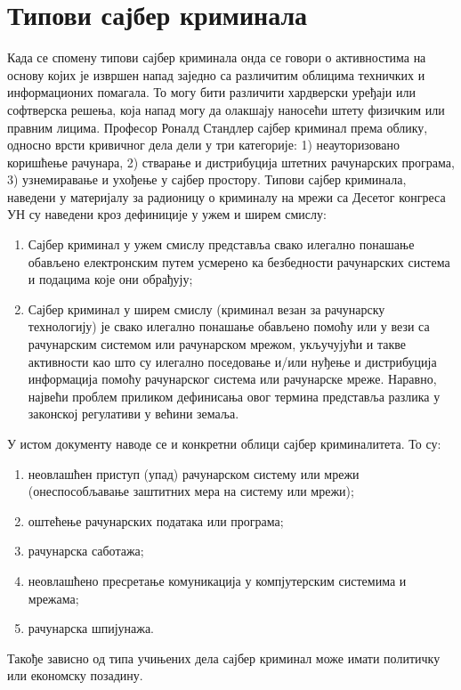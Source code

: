 \documentclass[a4paper]{article}
\begin{document}
	\section{Типови сајбер криминала}
	\label{sec:TipoviVisKri}
	Када се спомену типови сајбер криминала онда се говори о активностима на основу којих је извршен напад заједно са различитим облицима техничких и информационих помагала. То могу бити различити хардверски уређаји или софтверска решења, која напад могу да олакшају наносећи штету физичким или правним лицима. \newline
	Професор Роналд Стандлер сајбер криминал према облику, односно врсти кривичног дела дели у три категорије: 1) неауторизовано коришћење рачунара, 2) стварање и дистрибуција штетних рачунарских програма, 3) узнемиравање и ухођење у сајбер простору. \newline
	Типови сајбер криминала, наведени у материјалу за радионицу о криминалу на мрежи са Десетог конгреса УН су наведени кроз дефиниције у ужем и ширем смислу:
	\begin{enumerate}
		\item Сајбер криминал у ужем смислу представља свако илегално понашање обављено електронским путем усмерено ка безбедности рачунарских система и подацима које они обрађују;
		\item Сајбер криминал у ширем смислу (криминал везан за рачунарску технологију) је свако илегално понашање обављено помоћу или у вези са рачунарским системом или рачунарском мрежом, укључујући и такве активности као што су илегално поседовање и/или нуђење и дистрибуција информација помоћу рачунарског система или рачунарске мреже. Наравно, највећи проблем приликом дефинисања овог термина представља разлика у законској регулативи у већини земаља.
	\end{enumerate}
	
	У истом документу наводе се и конкретни облици сајбер криминалитета. То су:
	\begin{enumerate}
		\item неовлашћен приступ (упад) рачунарском систему или мрежи (онеспособљавање заштитних мера на систему или мрежи);
		\item оштећење рачунарских података или програма;
		\item рачунарска саботажа;
		\item неовлашћено пресретање комуникација у компјутерским системима и мрежама;
		\item рачунарска шпијунажа.
	\end{enumerate}
	Такође зависно од типа учињених дела сајбер криминал може имати политичку или економску позадину. \newline
	
\end{document}
